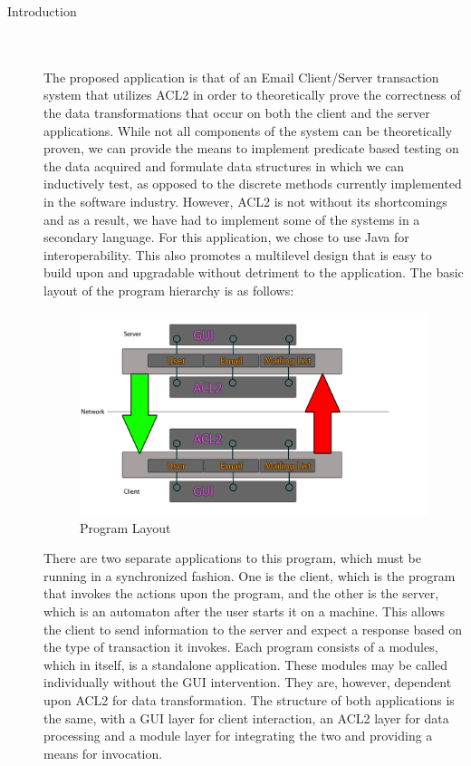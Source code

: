 \documentclass[11pt, letterpaper]{report}
\begin{document}
\begin{description}
\newpage

\setcounter{page}{1}

\hypertarget{Overview} {}
\item[\Large Introduction] \hfill \\ \hfill \\
The proposed application is that of an Email Client/Server transaction system that utilizes ACL2 in order to theoretically prove the correctness of the data transformations that occur on both the client and the server applications.  While not all components of the system can be theoretically proven, we can provide the means to implement predicate based testing on the data acquired and formulate data structures in which we can inductively test, as opposed to the discrete methods currently implemented in the software industry.  However, ACL2 is not without its shortcomings and as a result, we have had to implement some of the systems in a secondary language.  For this application, we chose to use Java for interoperability.  This also promotes a multilevel design that is easy to build upon and upgradable without detriment to the application. 
The basic layout of the program hierarchy is as follows: 
\begin{figure}[htbp]
\centering
\includegraphics[scale=0.42]{softArch}
\caption{Program Layout}
\end{figure}

There are two separate applications to this program, which must be running in a synchronized fashion.  One is the client, which is the program that invokes the actions upon the program, and the other is the server, which is an automaton after the user starts it on a machine.  This allows the client to send information to the server and expect a response based on the type of transaction it invokes.  Each program consists of a modules, which in itself, is a standalone application.  These modules may be called individually without the GUI intervention.  They are, however, dependent upon ACL2 for data transformation.  The structure of both applications is the same, with a GUI layer for client interaction, an ACL2 layer for data processing and a module layer for integrating the two and providing a means for invocation.


\end{description}
\end{document}
